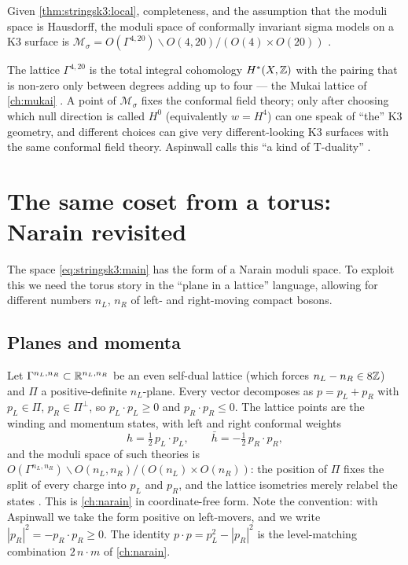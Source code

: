 \begin{theorem}\label{thm:stringsk3:global}
Given \cref{thm:stringsk3:local}, completeness, and the assumption that the moduli space is
Hausdorff, the moduli space of conformally invariant sigma models on a K3 surface is
$\mathcal M_\sigma=O(\Gamma^{4,20})\backslash O(4,20)/(O(4)\times O(20))$
.
\end{theorem}

The lattice $\Gamma^{4,20}$ is the total integral cohomology $H^*(X,\mathbb{Z})$ with the pairing that
is non-zero only between degrees adding up to four --- the Mukai lattice of \cref{ch:mukai}
. A point of $\mathcal M_\sigma$ fixes the conformal field
theory; only after choosing which null direction is called $H^0$ (equivalently $w=H^4$) can one
speak of ``the'' K3 geometry, and different choices can give very different-looking K3
surfaces with the same conformal field theory. Aspinwall calls this ``a kind of T-duality''
.

\section{The same coset from a torus: Narain revisited}\label{sec:stringsk3:narain}

The space \eqref{eq:stringsk3:main} has the form of a Narain moduli space. To exploit this we
need the torus story in the ``plane in a lattice'' language, allowing for different numbers
$n_L$, $n_R$ of left- and right-moving compact bosons.

\subsection{Planes and momenta}
Let $\Gamma^{n_L,n_R}\subset\mathbb{R}^{n_L,n_R}$ be an even self-dual lattice (which forces
$n_L-n_R\in8\mathbb{Z}$) and $\Pi$ a positive-definite $n_L$-plane. Every vector decomposes as
$p=p_L+p_R$ with $p_L\in\Pi$, $p_R\in\Pi^\perp$, so $p_L\cdot p_L\ge0$ and $p_R\cdot p_R\le0$.
The lattice points are the winding and momentum states, with left and right conformal weights
\begin{equation}\label{eq:stringsk3:weights}
  h=\tfrac12\,p_L\cdot p_L,\qquad \bar h=-\tfrac12\,p_R\cdot p_R ,
\end{equation}
and the moduli space of such theories is
$O(\Gamma^{n_L,n_R})\backslash O(n_L,n_R)/(O(n_L)\times O(n_R))$: the position of $\Pi$ fixes
the split of every charge into $p_L$ and $p_R$, and the lattice isometries merely relabel the
states . This is \cref{ch:narain} in
coordinate-free form. Note the convention: with Aspinwall we take the form positive on
left-movers, and we write $|p_R|^2=-p_R\cdot p_R\ge0$. The identity
$p\cdot p=p_L^2-|p_R|^2$ is the level-matching combination $2\,n\cdot m$ of
\cref{ch:narain}.

